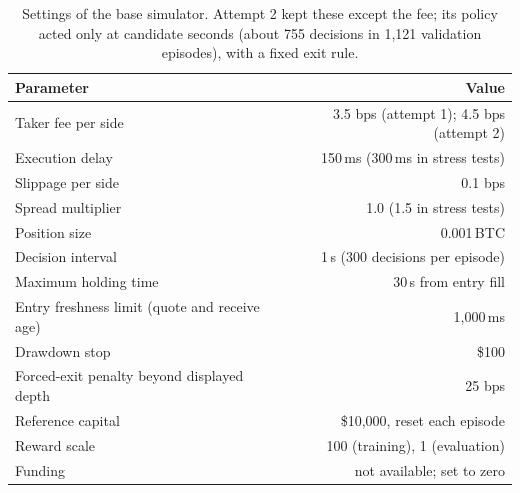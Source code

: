 \documentclass[12pt,a4paper]{article}
\DeclareRobustCommand{\bps}{\ifmmode\,\text{bps}\else\,bps\fi}
\begin{document}
\begin{table}[!htbp]
\centering
\caption{Settings of the base simulator. Attempt 2 kept these except the fee; its policy
acted only at candidate seconds (about 755 decisions in 1,121 validation episodes), with a
fixed exit rule.}
\label{tab:env}
\begin{tabular}{@{}lr@{}}
\toprule
Parameter & Value \\
\midrule
Taker fee per side & 3.5\bps{} (attempt 1); 4.5\bps{} (attempt 2) \\
Execution delay & 150\,ms (300\,ms in stress tests) \\
Slippage per side & 0.1\bps \\
Spread multiplier & 1.0 (1.5 in stress tests) \\
Position size & 0.001\,BTC \\
Decision interval & 1\,s (300 decisions per episode) \\
Maximum holding time & 30\,s from entry fill \\
Entry freshness limit (quote and receive age) & 1,000\,ms \\
Drawdown stop & \$100 \\
Forced-exit penalty beyond displayed depth & 25\bps \\
Reference capital & \$10,000, reset each episode \\
Reward scale & 100 (training), 1 (evaluation) \\
Funding & not available; set to zero \\
\bottomrule
\end{tabular}
\end{table}
\end{document}
